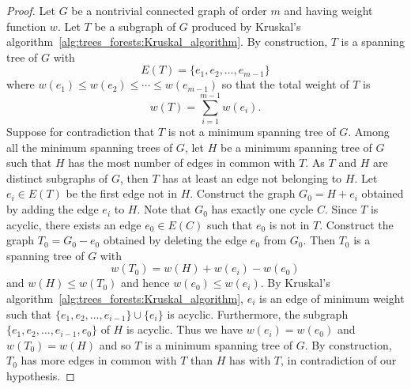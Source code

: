\begin{proof}
Let $G$ be a nontrivial connected graph of order $m$ and having weight
function $w$. Let $T$ be a subgraph of $G$ produced by Kruskal's
algorithm~\ref{alg:trees_forests:Kruskal_algorithm}. By construction,
$T$ is a spanning tree of $G$ with
\[
E(T)
=
\{e_1, e_2, \dots, e_{m-1}\}
\]
where $w(e_1) \leq w(e_2) \leq \cdots \leq w(e_{m-1})$ so that the
total weight of $T$ is
\[
w(T)
=
\sum_{i=1}^{m-1} w(e_i).
\]
Suppose for contradiction that $T$ is not a minimum spanning tree of
$G$. Among all the minimum spanning trees of $G$, let $H$ be a minimum
spanning tree of $G$ such that $H$ has the most number of edges in
common with $T$. As $T$ and $H$ are distinct subgraphs of $G$, then
$T$ has at least an edge not belonging to $H$. Let $e_i \in E(T)$ be
the first edge not in $H$. Construct the graph $G_0 = H + e_i$
obtained by adding the edge $e_i$ to $H$. Note that $G_0$ has exactly
one cycle $C$. Since $T$ is acyclic, there exists an edge
$e_0 \in E(C)$ such that $e_0$ is not in $T$. Construct the graph
$T_0 = G_0 - e_0$ obtained by deleting the edge $e_0$ from $G_0$. Then
$T_0$ is a spanning tree of $G$ with
\[
w(T_0)
=
w(H) + w(e_i) - w(e_0)
\]
and $w(H) \leq w(T_0)$ and hence $w(e_0) \leq w(e_i)$. By Kruskal's
algorithm~\ref{alg:trees_forests:Kruskal_algorithm}, $e_i$ is an edge
of minimum weight such that
$\{e_1, e_2, \dots, e_{i-1}\} \cup \{e_i\}$ is acyclic. Furthermore,
the subgraph $\{e_1, e_2, \dots, e_{i-1}, e_0\}$ of $H$ is
acyclic. Thus we have $w(e_i) = w(e_0)$ and $w(T_0) = w(H)$ and so $T$
is a minimum spanning tree of $G$. By construction, $T_0$ has more
edges in common with $T$ than $H$ has with $T$, in contradiction of
our hypothesis.
\end{proof}

